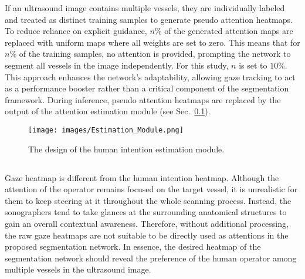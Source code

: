 \par
If an ultrasound image contains multiple vessels, they are individually labeled and treated as distinct training samples to generate pseudo attention heatmaps. To reduce reliance on explicit guidance, $n\%$ of the generated attention maps are replaced with uniform maps where all weights are set to zero. This means that for $n\%$ of the training samples, no attention is provided, prompting the network to segment all vessels in the image independently. For this study, $n$ is set to $10\%$. This approach enhances the network’s adaptability, allowing gaze tracking to act as a performance booster rather than a critical component of the segmentation framework. During inference, pseudo attention heatmaps are replaced by the output of the attention estimation module (see Sec.~\ref{sec_estimation_m}).

\begin{figure}[ht!]
\centering
\texttt{[image: images/Estimation\_Module.png]}
\caption{The design of the human intention estimation module.
}
\label{Fig_estimation_module}
\end{figure}


\subsection{}\label{sec_estimation_m}
Gaze heatmap is different from the human intention heatmap.
Although the attention of the operator remains focused on the target vessel, it is unrealistic for them to keep steering at it throughout the whole scanning process.
Instead, the sonographers tend to take glances at the surrounding anatomical structures to gain an overall contextual awareness. Therefore, without additional processing, the raw gaze heatmaps are not suitable to be directly used as attentions in the proposed segmentation network. In essence, the desired heatmap of the segmentation network should reveal the preference of the human operator among multiple vessels in the ultrasound image. 

